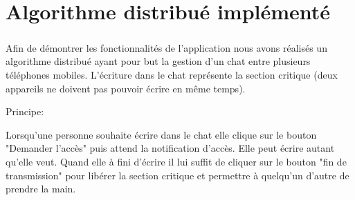 \documentclass[a4paper,10pt]{report}
\begin{document}
    
    
    
  \paragraph{}

\chapter{Algorithme distribué implémenté}
\paragraph{}
Afin de démontrer les fonctionnalités de l'application nous avons réalisés un algorithme distribué ayant  pour but la gestion d'un chat entre plusieurs téléphones mobiles. L'écriture dans le chat représente la section critique (deux appareils ne doivent pas pouvoir écrire en même temps).

Principe:

Lorsqu'une personne souhaite écrire dans le chat elle clique sur le bouton "Demander l'accès" puis attend la notification d'accès.
Elle peut écrire autant qu'elle veut.
Quand elle à fini d'écrire il lui suffit de cliquer sur le bouton "fin de transmission" pour libérer la section critique et permettre à quelqu'un d'autre de prendre la main.
\end{document}

